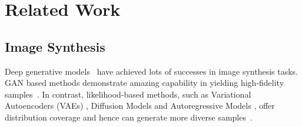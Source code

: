 \section{Related Work}
\label{sec:related}
\subsection{Image Synthesis}\label{sec:related_synthesis}
Deep generative models~\cite{KingmaW14, Vahdat2020nvae, goodfellow2014generative, SAGAN, Song19generative,dhariwal2021diffusion,Oord16pixelcnn, Parmar18imagetransformer} have achieved lots of successes in image synthesis tasks. GAN based methods demonstrate amazing capability in yielding high-fidelity samples~\cite{goodfellow2014generative, biggan, Karras2019stylegan2, SAGAN, tseng2021regularizing}.
In contrast, likelihood-based methods, such as Variational Autoencoders (VAEs) \cite{KingmaW14, Vahdat2020nvae}, Diffusion Models \cite{Song19generative,dhariwal2021diffusion,ho2021cascaded} and Autoregressive Models \cite{Oord16pixelcnn, Parmar18imagetransformer}, offer distribution coverage and hence can generate more diverse samples~\cite{Song19generative, Vahdat2020nvae, Oord16pixelcnn}. 

